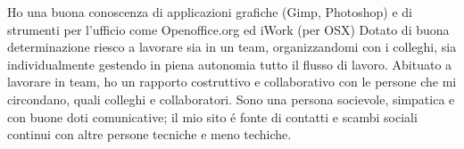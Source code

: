 \documentclass[10pt,a4paper]{moderncv}
\begin{document}
{Ho una buona conoscenza di applicazioni grafiche (Gimp, Photoshop) e di strumenti per l'ufficio come Openoffice.org ed iWork (per OSX)\newline
Dotato di buona determinazione riesco a lavorare sia in un team, organizzandomi con i colleghi, sia individualmente gestendo in piena autonomia tutto il flusso di lavoro. Abituato a lavorare in team, ho un rapporto costruttivo e collaborativo con le persone che mi circondano, quali colleghi e collaboratori. Sono una persona socievole, simpatica e con buone doti comunicative; il mio sito \'e fonte di contatti e scambi sociali continui con altre persone tecniche e meno techiche.}
\end{document}
